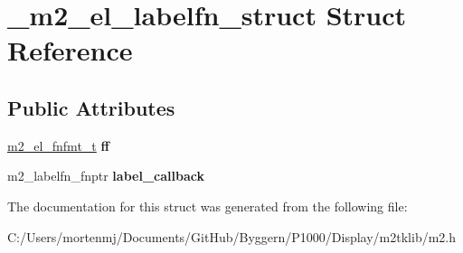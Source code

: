 \hypertarget{struct__m2__el__labelfn__struct}{\section{\-\_\-m2\-\_\-el\-\_\-labelfn\-\_\-struct Struct Reference}
\label{struct__m2__el__labelfn__struct}
}
\subsection*{Public Attributes}
\begin{DoxyCompactItemize}
\item 
\hypertarget{struct__m2__el__labelfn__struct_a1d65991be48ba53bf161c9fe5c657c68}{\hyperlink{struct__m2__el__fnfmt__struct}{m2\-\_\-el\-\_\-fnfmt\-\_\-t} {\bfseries ff}}\label{struct__m2__el__labelfn__struct_a1d65991be48ba53bf161c9fe5c657c68}

\item 
\hypertarget{struct__m2__el__labelfn__struct_a343a5cfdf5f8ea10d46aea1a537e7850}{m2\-\_\-labelfn\-\_\-fnptr {\bfseries label\-\_\-callback}}\label{struct__m2__el__labelfn__struct_a343a5cfdf5f8ea10d46aea1a537e7850}

\end{DoxyCompactItemize}


The documentation for this struct was generated from the following file\-:\begin{DoxyCompactItemize}
\item 
C\-:/\-Users/mortenmj/\-Documents/\-Git\-Hub/\-Byggern/\-P1000/\-Display/m2tklib/m2.\-h\end{DoxyCompactItemize}
